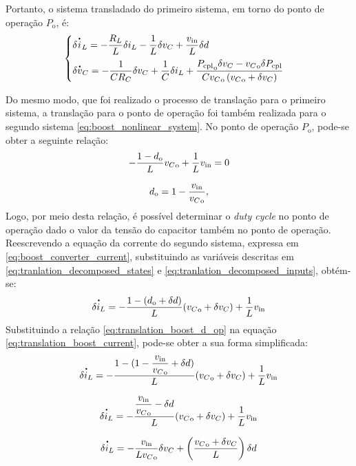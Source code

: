 Portanto, o sistema transladado do primeiro sistema, em torno do ponto de operação $P_{\mathrm{o}}$, é: \begin{equation}
  \begin{cases}
    \displaystyle \delta \dt{i}_L = - \frac{R_L}{L} \delta i_L - \frac{1}{L} \delta v_C  + \frac{v_{\mathrm{in}}}{L} \delta d \\[8pt]
    \displaystyle \delta \dt{v}_C = - \frac{1}{C R_C} \delta v_C  + \frac{1}{C}  \delta i_L + \frac{{P_{\mathrm{cpl}}}_{\mathrm{o}} \delta v_C - {v_C}_{\mathrm{o}} \delta P_{\mathrm{cpl}}}{C {v_C}_{\mathrm{o}} \left({v_C}_{\mathrm{o}} + \delta v_C\right)}
    \label{eq:translated_nonlinear_buck}
  \end{cases}
\end{equation}

Do mesmo modo, que foi realizado o processo de translação para o primeiro sistema, a translação para o ponto de operação foi também realizada para o segundo sistema \eqref{eq:boost_nonlinear_system}. No ponto de operação $P_{\mathrm{o}}$, pode-se obter a seguinte relação: \begin{gather}
  - \frac{1 - d_{\mathrm{o}}}{L}{v_C}_{\mathrm{o}} + \frac{1}{L}v_{\mathrm{in}} = 0 \notag \\[8pt]
  {d}_{\mathrm{o}} = 1 - \frac{v_{\mathrm{in}}}{{v_C}_{\mathrm{o}}} \label{eq:translation_boost_d_op},
\end{gather} Logo, por meio desta relação, é possível determinar o \textit{duty cycle }no ponto de operação dado o valor da tensão do capacitor também no ponto de operação. Reescrevendo a equação da corrente do segundo sistema, expressa em \eqref{eq:boost_converter_current}, substituindo as variáveis descritas em \eqref{eq:tranlation_decomposed_states} e \eqref{eq:tranlation_decomposed_inputs}, obtém-se: \begin{gather}
  \dt{\delta i_L}  = - \frac{1 - (d_{\mathrm{o}} + \delta d) }{L} ({v_C}_{\mathrm{o}} + \delta v_C) + \frac{1}{L} v_{\mathrm{in}} \label{eq:translation_boost_current}
\end{gather} Substituindo a relação \eqref{eq:translation_boost_d_op} na equação \eqref{eq:translation_boost_current}, pode-se obter a sua forma simplificada: \begin{gather}
  \dt{\delta i_L}  = - \frac{1 - (1 - \displaystyle \frac{v_{\mathrm{in}}}{{v_C}_{\mathrm{o}}} + \delta d) }{L} ({v_C}_{\mathrm{o}} + \delta v_C) + \frac{1}{L} v_{\mathrm{in}} \notag  \\[8pt]
  \dt{\delta i_L}  = - \frac{\displaystyle \frac{v_{\mathrm{in}}}{{v_C}_{\mathrm{o}}} - \delta d }{L} ({v_C}_{\mathrm{o}} + \delta v_C) + \frac{1}{L} v_{\mathrm{in}} \notag  \\[8pt]
  \dt{\delta i_L}  = - \frac{v_{\mathrm{in}}}{L{v_C}_{\mathrm{o}}}\delta v_C + \left(\frac{{v_C}_{\mathrm{o}} + \delta {v_C}}{L}\right) \delta d
\end{gather}

